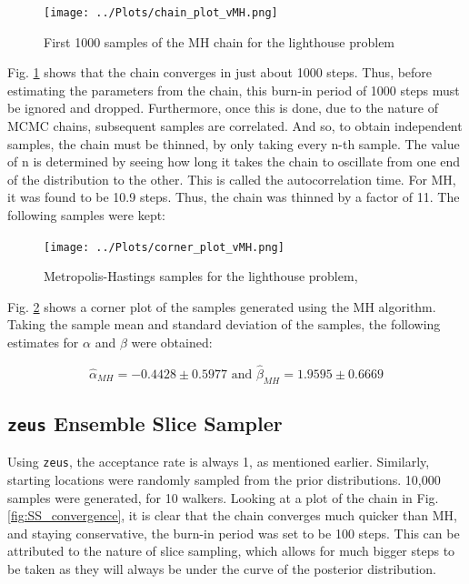 \documentclass[12pt]{report} %
\begin{document}
\begin{figure}[h]
\centering
\texttt{[image: ../Plots/chain\_plot\_vMH.png]}
\caption{First 1000 samples of the MH chain for the lighthouse problem}
\label{fig:MH_convergence}
\end{figure}

Fig. \ref{fig:MH_convergence} shows that the chain converges in just about 1000 steps. Thus, before estimating the parameters from the chain, this burn-in period of 1000 steps must be ignored and dropped. Furthermore, once this is done, due to the nature of MCMC chains, subsequent samples are correlated. And so, to obtain independent samples, the chain must be thinned, by only taking every n-th sample. The value of n is determined by seeing how long it takes the chain to oscillate from one end of the distribution to the other. This is called the autocorrelation time. For MH, it was found to be 10.9 steps. Thus, the chain was thinned by a factor of 11. The following samples were kept:
\newpage

\begin{figure}[h]
\centering
\texttt{[image: ../Plots/corner\_plot\_vMH.png]}
\caption{Metropolis-Hastings samples for the lighthouse problem, }
\label{fig:MH_samples}
\end{figure}

Fig. \ref{fig:MH_samples} shows a corner plot of the samples generated using the MH algorithm. Taking the sample mean and standard deviation of the samples, the following estimates for $\alpha$ and $\beta$ were obtained:

\begin{equation}
    \hat{\alpha}_{MH} = -0.4428 \pm 0.5977 \text{ and } \hat{\beta}_{MH} = 1.9595 \pm 0.6669
\end{equation}

\subsection{\texttt{zeus} Ensemble Slice Sampler}

Using \texttt{zeus}, the acceptance rate is always 1, as mentioned earlier. Similarly, starting locations were randomly sampled from the prior distributions. 10,000 samples were generated, for 10 walkers. Looking at a plot of the chain in Fig. \ref{fig:SS_convergence}, it is clear that the chain converges much quicker than MH, and staying conservative, the burn-in period was set to be 100 steps. This can be attributed to the nature of slice sampling, which allows for much bigger steps to be taken as they will always be under the curve of the posterior distribution.
\end{document}
